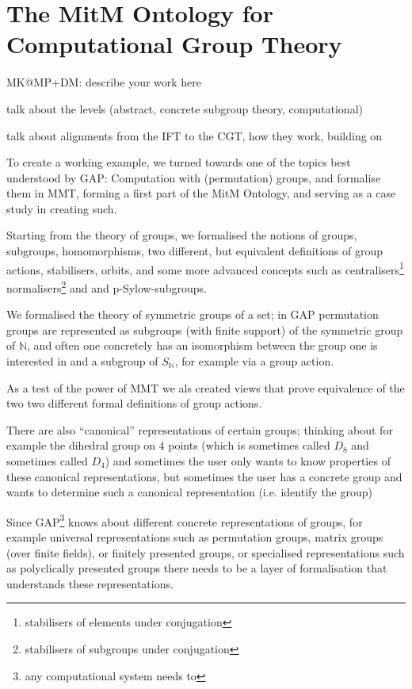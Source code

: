 \section{The MitM Ontology for Computational Group Theory}\label{sec:cgt}
\begin{todolist}{MK@MP+DM: describe your work here}
\item talk about the levels (abstract, concrete subgroup theory, computational)
\item talk about alignments from the IFT to the CGT, how they work, building
  on~\cite{MueRoYuRa:abtafs17,MueGauKal:cacfms17} 
\end{todolist}

To create a working example, we turned towards one of the topics best
understood by GAP: Computation with (permutation) groups, and formalise them in
MMT, forming a first part of the MitM Ontology, and serving as a case study in
creating such.

Starting from the theory of groups, we formalised the notions of
groups, subgroups, homomorphisms, two different, but equivalent definitions of
group actions, stabilisers, orbits, and some more advanced concepts such as
centralisers\footnote{stabilisers of elements under
conjugation} normalisers\footnote{stabilisers of subgroups under
conjugation} and and p-Sylow-subgroups.

We formalised the theory of symmetric groups of a set; in GAP permutation groups
are represented as subgroups (with finite support) of the symmetric group of
$\mathbb{N}$, and often one concretely has an isomorphism between the group one
is interested in and a subgroup of $S_{\mathbb{N}}$, for example
via a group action.

As a test of the power of MMT we als created views that prove equivalence of the
two two different formal definitions of group actions.

There are also
``canonical'' representations of certain groups; thinking about for example
the dihedral group on $4$ points (which is sometimes called $D_8$ and sometimes
called $D_4$) and sometimes the user only wants to know properties of these canonical
representations, but sometimes the user has a concrete group and wants to
determine such a canonical representation (i.e. identify the group)

Since GAP\footnote{any computational system needs to}
knows about different
concrete representations of groups, for example universal representations such
as permutation groups, matrix groups (over finite fields), or finitely presented
groups, or specialised representations such as polyclically presented groups
there needs to be a layer of formalisation that
understands these representations.

